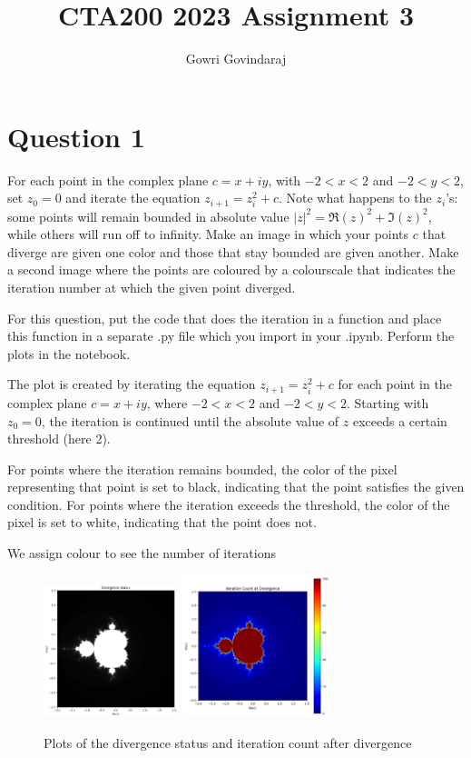 \documentclass{article}
\title{CTA200 2023 Assignment 3}
\author{Gowri Govindaraj}
\date{}
\begin{document}
\maketitle

\section*{Question 1}

For each point in the complex plane $c = x + iy$, with $-2 < x < 2$ and $-2 < y < 2$, set $z_0 = 0$ and iterate the equation $z_{i + 1} = z_i^2 + c$. 
Note what happens to the $z_i$'s: some points will remain bounded in absolute value $|z|^2 = \Re(z)^2 + \Im(z)^2$, while others will run off to infinity. 
Make an image  in which your points $c$ that diverge are given one color and those that stay bounded are given another.
Make a second image where the points are coloured by a colourscale that indicates the iteration number at which the given point diverged.

For this question, put the code that does the iteration in a function and place this function in a separate .py file which you import in your .ipynb.
Perform the plots in the notebook.



The plot is created by iterating the equation $z_{i + 1} = z_i^2 + c$ for each point in the complex plane $c = x + iy$, where $-2 < x < 2$ and $-2 < y < 2$. Starting with $z_0 = 0$, the iteration is continued until the absolute value of $z$ exceeds a certain threshold (here 2).

For points where the iteration remains bounded, the color of the pixel representing that point is set to black, indicating that the point satisfies the given condition. For points where the iteration exceeds the threshold, the color of the pixel is set to white, indicating that the point does not.

We assign colour to see the number of iterations

\begin{figure}[!h]
\centering
    \includegraphics[width=0.35\textwidth]{a1.png}
    \includegraphics[width=0.385\textwidth]{a2.png}
    \caption{Plots of the divergence status and iteration count after divergence}
\end{figure}
\end{document}
